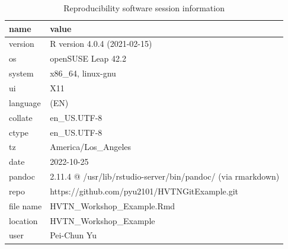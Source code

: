 \documentclass[11pt]{article}
\begin{document}
\begin{table}

\caption{\label{tab:Software-Session-Information}Reproducibility software session information}
\centering
\fontsize{10}{12}\selectfont
\begin{tabular}[t]{ll}
\toprule
name & value\\
\midrule
version & R version 4.0.4 (2021-02-15)\\
os & openSUSE Leap 42.2\\
system & x86\_64, linux-gnu\\
ui & X11\\
language & (EN)\\
collate & en\_US.UTF-8\\
ctype & en\_US.UTF-8\\
tz & America/Los\_Angeles\\
date & 2022-10-25\\
pandoc & 2.11.4 @ /usr/lib/rstudio-server/bin/pandoc/ (via rmarkdown)\\
repo & https://github.com/pyu2101/HVTNGitExample.git\\
file name & HVTN\_Workshop\_Example.Rmd\\
location & HVTN\_Workshop\_Example\\
user & Pei-Chun Yu\\
\bottomrule
\end{tabular}
\end{table}
\end{document}
